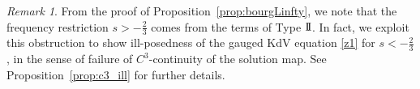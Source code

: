 \documentclass[%
11pt,  reqno]{amsart}
\makeatletter
\newcommand{\II}{\textup{I \hspace{-2.9mm} I} }
\newcommand{\IV}{\textup{I \hspace{-2.9mm} V}}
\newcommand{\5}{\textup{V}}
\newcommand{\VI}{\text{V\hspace{-1.6mm} I}}
\theoremstyle{remark}
\newtheorem{remark}[theorem]{Remark}
\def\<#1>{\csname MH@symb@#1\endcsname}
\numberwithin{equation}{section}
\numberwithin{theorem}{section}
\makeatother
\begin{document}
\begin{remark}
\rm 


From the proof of Proposition~\ref{prop:bourgLinfty}, we note that the frequency restriction $s> -\frac23$ comes from the terms of Type $\II$.
In fact, 
we exploit this obstruction to show ill-posedness of the gauged KdV equation \eqref{z1} 
for $s<-\frac23$, in the sense of failure of $C^3$-continuity of the solution map. See Proposition~\ref{prop:c3_ill} for further details. 
% 

\end{remark}
\end{document}
